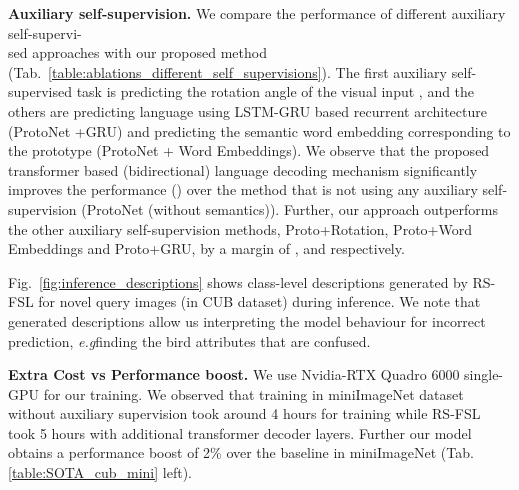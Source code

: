 \documentclass{bmvc2k}
\def\eg{\emph{e.g}\bmvaOneDot}
\begin{document}
\noindent \textbf{Auxiliary self-supervision.} We compare the performance of different auxiliary self-supervi-\\sed approaches with our proposed method (Tab.~\ref{table:ablations_different_self_supervisions}). The first auxiliary self-supervised task is predicting the rotation angle of the visual input \cite{rizve2021exploring,rajasegaran2020self}, and the others are predicting language using LSTM-GRU based recurrent architecture (ProtoNet +GRU) \cite{mu2020shaping} and predicting the semantic word embedding corresponding to the prototype (ProtoNet + Word Embeddings).  We observe that the proposed transformer based (bidirectional) language decoding mechanism significantly improves the performance () over the method that is not using any auxiliary self-supervision (ProtoNet (without semantics)). Further, our approach outperforms the other auxiliary self-supervision methods, Proto+Rotation, Proto+Word Embeddings and Proto+GRU, by a margin of ,  and  respectively.



Fig.~\ref{fig:inference_descriptions} shows class-level descriptions generated by RS-FSL for novel query images (in CUB dataset) during inference. We note that generated descriptions allow us interpreting the model behaviour for incorrect prediction, \eg finding the bird attributes that are confused.

\begin{SCtable}[][h]
\centering{}
\caption{Comparison between different auxiliary training methods. Average few-shot 5-way 1-shot accuracy reported with 95\% confidence interval}
\label{table:ablations_different_self_supervisions}
\end{SCtable}

\noindent \textbf{Extra Cost vs Performance boost.} We use Nvidia-RTX Quadro 6000 single-GPU for our training. We observed that training in miniImageNet dataset without auxiliary supervision took around 4 hours for training while RS-FSL took 5 hours with additional transformer decoder layers. Further our model obtains a performance boost of 2\% over the baseline in miniImageNet (Tab. \ref{table:SOTA_cub_mini} left).
\end{document}
